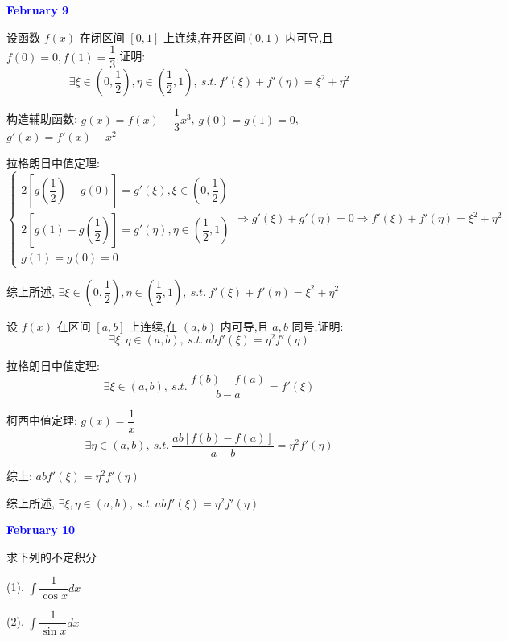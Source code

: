 \textcolor{blue}{\textbf{February 9}}

\begin{example}[][Exam: 28.2.3]
	设函数 $f(x)$ 在闭区间 $[0,1]$ 上连续,在开区间$(0,1)$ 内可导,且$f(0)=0,f(1)=\dfrac{1}{3}$,证明:
	$$\exists \xi\in\left(0,\dfrac{1}{2}\right),\eta\in\left( \dfrac{1}{2},1\right),\ s.t.\ f'(\xi)+f'(\eta)=\xi^{2}+\eta^{2}$$
\end{example}
\begin{solution}

	构造辅助函数: $g(x) = f(x) - \dfrac{1}{3}x^{3}$, $g(0) = g(1) = 0$, $g'(x) =f'(x) -x^{2}$

	拉格朗日中值定理:
	$$\begin{cases}
		2[g(\dfrac{1}{2})-g(0)] = g'(\xi), \xi\in(0,\dfrac{1}{2})\\
		2[g(1)-g(\dfrac{1}{2})] = g'(\eta), \eta\in(\dfrac{1}{2},1)\\
		g(1) = g(0) = 0
	\end{cases}\Rightarrow g'(\xi) + g'(\eta) = 0\Rightarrow f'(\xi) + f'(\eta) =\xi^{2} +\eta^{2}$$

	综上所述, $\exists \xi\in\left(0,\dfrac{1}{2}\right),\eta\in\left( \dfrac{1}{2},1\right),\ s.t.\ f'(\xi)+f'(\eta)=\xi^{2}+\eta^{2}$
\end{solution}

\begin{example}[][Exam: 28.2.4]
	设 $f(x)$ 在区间 $[a,b]$ 上连续,在 $(a,b)$ 内可导,且 $a,b$ 同号,证明:
	$$\exists \xi,\eta\in(a,b),\ s.t.\ abf'(\xi)=\eta^{2}f'(\eta)$$
\end{example}

\begin{solution}

	拉格朗日中值定理:
	$$\exists \xi\in (a,b),\ s.t.\ \dfrac{f(b)-f(a)}{b-a} = f'(\xi)$$

	柯西中值定理: $g(x) = \dfrac{1}{x}$
	$$\exists \eta\in(a,b),\ s.t.\ \dfrac{ab[f(b)-f(a)]}{a-b} = \eta^{2}f'(\eta)$$

	综上: $abf'(\xi) = \eta^{2}f'(\eta)$

	综上所述, $\exists \xi,\eta\in(a,b),\ s.t.\ abf'(\xi)=\eta^{2}f'(\eta)$
\end{solution}

\textcolor{blue}{\textbf{February 10}}

\begin{example}[][Exam: 28.2.5]
	求下列的不定积分

(1). $\displaystyle{\int \dfrac{1}{\cos x}dx}$

(2). $\displaystyle{\int \dfrac{1}{\sin x}dx}$
\end{example}

